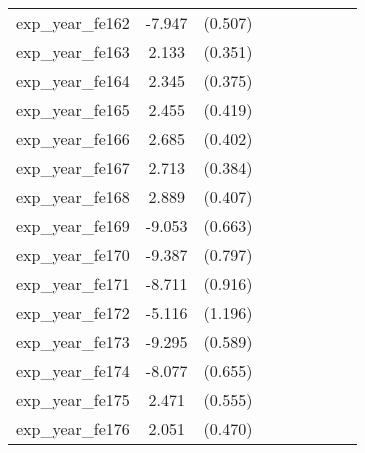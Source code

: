 {\begin{tabular}{l*{4}{cc}}
exp\_year\_fe162&   -7.947\sym{***}&  (0.507)&                  &         &                  &         &                  &         \\
exp\_year\_fe163&    2.133\sym{***}&  (0.351)&                  &         &                  &         &                  &         \\
exp\_year\_fe164&    2.345\sym{***}&  (0.375)&                  &         &                  &         &                  &         \\
exp\_year\_fe165&    2.455\sym{***}&  (0.419)&                  &         &                  &         &                  &         \\
exp\_year\_fe166&    2.685\sym{***}&  (0.402)&                  &         &                  &         &                  &         \\
exp\_year\_fe167&    2.713\sym{***}&  (0.384)&                  &         &                  &         &                  &         \\
exp\_year\_fe168&    2.889\sym{***}&  (0.407)&                  &         &                  &         &                  &         \\
exp\_year\_fe169&   -9.053\sym{***}&  (0.663)&                  &         &                  &         &                  &         \\
exp\_year\_fe170&   -9.387\sym{***}&  (0.797)&                  &         &                  &         &                  &         \\
exp\_year\_fe171&   -8.711\sym{***}&  (0.916)&                  &         &                  &         &                  &         \\
exp\_year\_fe172&   -5.116\sym{***}&  (1.196)&                  &         &                  &         &                  &         \\
exp\_year\_fe173&   -9.295\sym{***}&  (0.589)&                  &         &                  &         &                  &         \\
exp\_year\_fe174&   -8.077\sym{***}&  (0.655)&                  &         &                  &         &                  &         \\
exp\_year\_fe175&    2.471\sym{***}&  (0.555)&                  &         &                  &         &                  &         \\
exp\_year\_fe176&    2.051\sym{***}&  (0.470)&                  &         &                  &         &                  &         \\

\end{tabular}}
